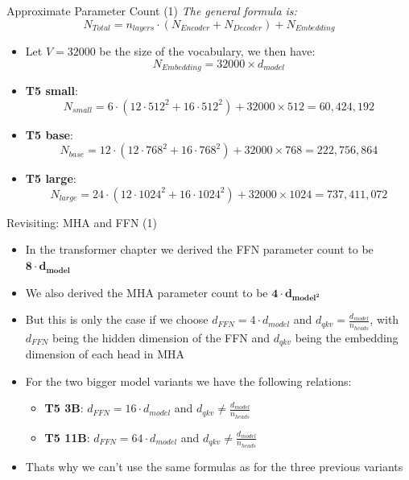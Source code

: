 \begin{frame}{Approximate Parameter Count (1)}
\textit{The general formula is:} $$N_{Total} = n_{layers}\cdot (N_{Encoder} + N_{Decoder}) + N_{Embedding}$$

\begin{itemize}
    \item Let $V = 32000$ be the size of the vocabulary, we then have: $$N_{Embedding} = 32000 \times d_{model}$$

    \item \textbf{T5 small}:
        $$N_{small} = 6\cdot (12\cdot 512^2 + 16\cdot 512^2) + 32000\times 512 = 60,424,192$$
    \item \textbf{T5 base}:
        $$N_{base} = 12\cdot (12\cdot 768^2 + 16\cdot 768^2) + 32000\times 768 = 222,756,864$$
    \item \textbf{T5 large}:
        $$N_{large} = 24\cdot (12\cdot 1024^2 + 16\cdot 1024^2) + 32000\times 1024 = 737,411,072$$
    
\end{itemize}
    
\end{frame}


\begin{frame}{Revisiting: MHA and FFN (1)}

\hspace{}

\begin{itemize}
    \item In the transformer chapter we derived the FFN parameter count to be $\bm{8\cdot d_{model}}$
    \item We also derived the MHA parameter count to be $\bm{4\cdot d_{model^2}}$ 
    \item But this is only the case if we choose $d_{FFN} = 4\cdot d_{model}$ and $d_{qkv} = \frac{d_{model}}{n_{heads}}$, with $d_{FFN}$ being the hidden dimension of the FFN and $d_{qkv}$ being the embedding dimension of each head in MHA 
    \item For the two bigger model variants we have the following relations:
    \begin{itemize}
        \item \textbf{T5 3B}: $d_{FFN} = 16\cdot d_{model}$ and $d_{qkv} \neq \frac{d_{model}}{n_{heads}}$
        \item \textbf{T5 11B}: $d_{FFN} = 64\cdot d_{model}$ and $d_{qkv} \neq \frac{d_{model}}{n_{heads}}$ 
    \end{itemize}
    \item Thats why we can't use the same formulas as for the three previous variants
\end{itemize}
    
\end{frame}

